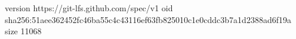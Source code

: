 version https://git-lfs.github.com/spec/v1
oid sha256:51aee362452fc46ba55c4c43116ef63fb825010c1e0cddc3b7a1d2388ad6f19a
size 11068
